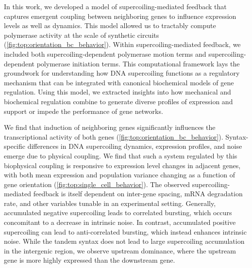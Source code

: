 \documentclass[11pt]{article} %
\begin{document}
In this work, we developed a model of supercoiling-mediated feedback that captures emergent coupling between neighboring genes to influence expression levels as well as dynamics. This model allowed us to tractably compute polymerase activity at the scale of synthetic circuits (\cref{fig:top:orientation_bc_behavior}). Within supercoiling-mediated feedback, we included both supercoiling-dependent polymerase motion terms and supercoiling-dependent polymerase initiation terms. This computational framework lays the groundwork for understanding how DNA supercoiling functions as a regulatory mechanism that can be integrated with canonical biochemical models of gene regulation. Using this model, we extracted insights into how mechanical and biochemical regulation combine to generate diverse profiles of expression and support or impede the performance of gene networks.

We find that induction of neighboring genes significantly influences the transcriptional activity of both genes (\cref{fig:top:orientation_bc_behavior}). Syntax-specific differences in DNA supercoiling dynamics, expression profiles, and noise emerge due to physical coupling. We find that such a system regulated by this biophysical coupling is responsive to expression level changes in adjacent genes, with both mean expression and population variance changing as a function of gene orientation (\cref{fig:top:single_cell_behavior}). The observed supercoiling-mediated feedback is itself dependent on inter-gene spacing, mRNA degradation rate, and other variables tunable in an experimental setting. Generally, accumulated negative supercoiling leads to correlated bursting, which occurs concomitant to a decrease in intrinsic noise. In contrast, accumulated positive supercoiling can lead to anti-correlated bursting, which instead enhances intrinsic noise. While the tandem syntax does not lead to large supercoiling accumulation in the intergenic region, we observe upstream dominance, where the upstream gene is more highly expressed than the downstream gene.
\end{document}
